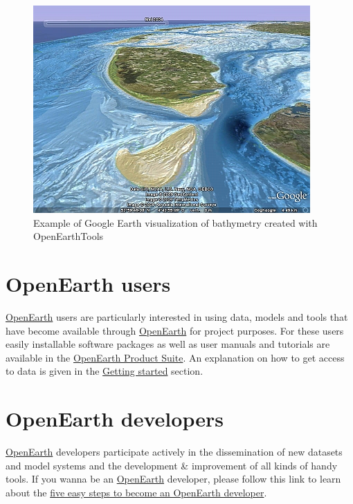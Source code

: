 \documentclass[a4paper, twocolumn, 12pt]{article}
\begin{document}
\begin{figure}[ht]

\includegraphics[width=\linewidth]{figures/vaklodingen_small.jpg}
\caption{Example of Google Earth visualization of bathymetry created with OpenEarthTools}
\end{figure}

\section*{OpenEarth users}
\href{http://www.openearth.eu}{OpenEarth} users are particularly interested in using data, models and tools that have become available through \href{http://www.openearth.eu}{OpenEarth} for project purposes. For these users easily installable software packages as well as user manuals and tutorials are available in the \href{https://publicwiki.deltares.nl/display/OET/OpenEarth+Product+Suite}{OpenEarth Product Suite}. An explanation on how to get access to data is given in the \href{https://publicwiki.deltares.nl/display/OET/Getting+started}{Getting started} section.
\section*{OpenEarth developers}
\href{http://www.openearth.eu}{OpenEarth} developers participate actively in the dissemination of new datasets and model systems and the development \& improvement of all kinds of handy tools. If you wanna be an \href{http://www.openearth.eu}{OpenEarth} developer, please follow this link to learn about the \href{https://publicwiki.deltares.nl/display/OET/OpenEarth+developer+in+five+easy+steps}{five easy steps to become an OpenEarth developer}.
\end{document}
